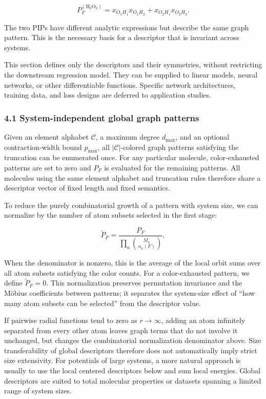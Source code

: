 \[
P_F^{(\mathrm{H_2O_2})}
=x_{O_1H_1}x_{O_1H_2}
+x_{O_2H_1}x_{O_2H_2}.
\]

The two PIPs have different analytic expressions but describe the same graph pattern. This is the necessary basis for a descriptor that is invariant across systems.

This section defines only the descriptors and their symmetries, without restricting the downstream regression model. They can be supplied to linear models, neural networks, or other differentiable functions. Specific network architectures, training data, and loss designs are deferred to application studies.

\subsubsection{4.1 System-independent global graph patterns}\label{sec:global-patterns}

Given an element alphabet \(\mathcal C\), a maximum degree \(d_{\max}\), and an optional contraction-width bound \(p_{\max}\), all \(|\mathcal C|\)-colored graph patterns satisfying the truncation can be enumerated once. For any particular molecule, color-exhausted patterns are set to zero and \(P_F\) is evaluated for the remaining patterns. All molecules using the same element alphabet and truncation rules therefore share a descriptor vector of fixed length and fixed semantics.

To reduce the purely combinatorial growth of a pattern with system size, we can normalize by the number of atom subsets selected in the first stage:

\[
\widetilde P_F
=
\frac{P_F}
{\displaystyle\prod_a\binom{M_a}{n_a(F)}} ,
\]

When the denominator is nonzero, this is the average of the local orbit sums over all atom subsets satisfying the color counts. For a color-exhausted pattern, we define \(\widetilde P_F=0\). This normalization preserves permutation invariance and the M\"obius coefficients between patterns; it separates the system-size effect of ``how many atom subsets can be selected'' from the descriptor value.

If pairwise radial functions tend to zero as \(r\rightarrow\infty\), adding an atom infinitely separated from every other atom leaves graph terms that do not involve it unchanged, but changes the combinatorial normalization denominator above. Size transferability of global descriptors therefore does not automatically imply strict size extensivity. For potentials of large systems, a more natural approach is usually to use the local centered descriptors below and sum local energies. Global descriptors are suited to total molecular properties or datasets spanning a limited range of system sizes.

